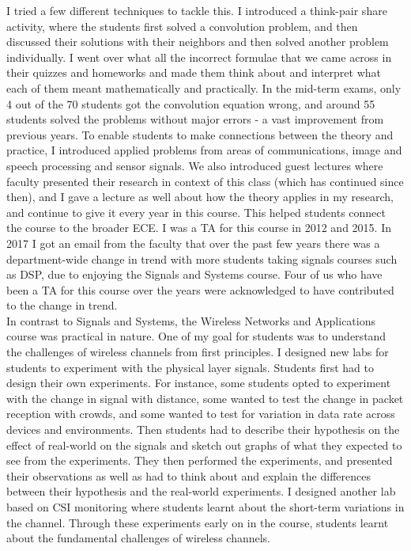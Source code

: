 \documentclass[10pt]{article}
\begin{document}
I tried a few different techniques to tackle this. I introduced a think-pair share activity, where the students first solved a convolution problem, and then discussed their solutions with their neighbors and then solved another problem individually. I went over what all the incorrect formulae that we came across in their quizzes and homeworks and made them think about and interpret what each of them meant mathematically and practically. In the mid-term exams, only 4 out of the 70 students got the convolution equation wrong, and around 55 students solved the problems without major errors - a vast improvement from previous years. To enable students to make connections between the theory and practice, I introduced applied problems from areas of communications, image and speech processing and sensor signals. We also introduced guest lectures where faculty presented their research in context of this class (which has continued since then), and I gave a lecture as well about how the theory applies in my research, and continue to give it every year in this course. This helped students connect the course to the broader ECE. I was a TA for this course in 2012 and 2015. In 2017 I got an email from the faculty that over the past few years there was a department-wide change in trend with more students taking signals courses such as DSP, due to enjoying the Signals and Systems course.
Four of us who have been a TA for this course over the years were acknowledged to have contributed to the change in trend. \\ 

In contrast to Signals and Systems, the Wireless Networks and Applications course was practical in nature.  %
One of my goal for students was to understand the challenges of wireless channels from first principles. I designed new labs for students to experiment with the physical layer signals. Students first had to design their own experiments. For instance, some students opted to experiment with the change in signal with distance, some wanted to test the change in packet reception with crowds, and some wanted to test for variation in data rate across devices and environments. Then students had to describe their hypothesis on the effect of real-world on the signals and sketch out graphs of what they expected to see from the experiments. They then performed the experiments, and presented their observations as well as had to think about and explain the differences between their hypothesis and the real-world experiments. I designed another lab based on CSI monitoring where students learnt about the short-term variations in the channel. Through these experiments early on in the course, students learnt about the fundamental challenges of wireless channels.
\end{document}
